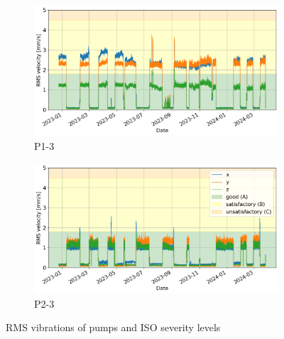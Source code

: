 \documentclass{llncs}
\begin{document}
\begin{figure}
     \begin{subfigure}[b]{0.48\textwidth}
         \centering
         \includegraphics[width=\textwidth]{fig/ksb-cloud/P1-rms-vibration.png}
         \caption{P1-3}
         \label{fig:P1-ksb-rms}
     \end{subfigure}
     \hfill
     \begin{subfigure}[b]{0.48\textwidth}
         \centering
         \includegraphics[width=\textwidth]{fig/ksb-cloud/P2-rms-vibration.png}
         \caption{P2-3}
         \label{fig:P2-ksb-rms}
     \end{subfigure}
     \caption{RMS vibrations of pumps and ISO severity levels}
\end{figure}
\end{document}
